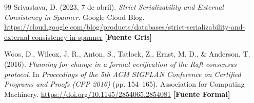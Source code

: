 \documentclass[12pt,letterpaper]{article}
\begin{document}
\begin{thebibliography}{99}
Srivastava, D. (2023, 7 de abril). 
\textit{Strict Serializability and External Consistency in Spanner}. 
Google Cloud Blog. 
\url{https://cloud.google.com/blog/products/databases/strict-serializability-and-external-consistency-in-spanner} \textbf{[Fuente Gris]}

Woos, D., Wilcox, J. R., Anton, S., Tatlock, Z., Ernst, M. D., \& Anderson, T. (2016).
\textit{Planning for change in a formal verification of the Raft consensus protocol}.
In \textit{Proceedings of the 5th ACM SIGPLAN Conference on Certified Programs and Proofs (CPP 2016)} (pp. 154--165).
Association for Computing Machinery.
\url{https://doi.org/10.1145/2854065.2854081} \textbf{[Fuente Formal]}

\end{thebibliography}
\end{document}

